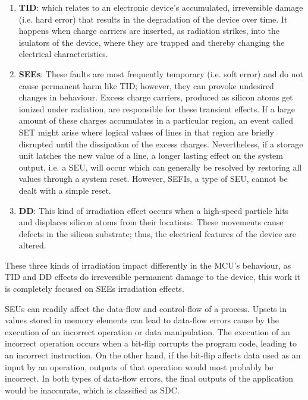 \documentclass[10pt, a4paper]{report}
\begin{document}
\begin{enumerate}
    \item \textbf{\acrfull{TID}}: which relates to an electronic device's
        accumulated, irreversible damage (i.e. hard error) that results in the
        degradation of the device over time. It happens when charge carriers
        are inserted, as radiation strikes, into the isulators of the device,
        where they are trapped and thereby changing the electrical 
        characteristics.
    \item \textbf{\acrfull{SEEs}}: These faults are most frequently temporary
        (i.e. soft error) and do not cause permanent harm like \acrshort{TID};
        however, they can provoke undesired changes in behaviour. Excess charge
        carriers, produced as silicon atoms get ionized under radiation, are
        responsible for these transient effects. If a large amount of these
        charges accumulates in a particular region, an event called 
        \acrfull{SET} might arise where logical values of lines in that region
        are briefly disrupted until the dissipation of the excess charges.
        Nevertheless, if a storage unit latches the new value of a line, a
        longer lasting effect on the system output, i.e. a \acrfull{SEU}, will
        occur which can generally be resolved by restoring all values through a
        system reset. However, \acrfull{SEFIs}, a type of \acrshort{SEU}, cannot
        be dealt with a simple reset.
    \item \textbf{\acrfull{DD}}: This kind of irradiation effect occurs when a
        high-speed particle hits and displaces silicon atoms from their
        locations. These movements cause defects in the silicon substrate; thus,
        the electrical features of the device are altered.
\end{enumerate}

These three kinds of irradiation impact differently in the \acrshort{MCU}'s
behaviour, as \acrshort{TID} and \acrshort{DD} effects do irreversible permanent 
damage to the device, this work it is completely focused on \acrshort{SEEs} 
irradiation effects.

\acrshort{SEU}s can readily affect the data-flow and control-flow of a
process. Upsets in values stored in memory elements can lead to data-flow errors 
cause by the execution of an incorrect operation or data manipulation. The
execution of an incorrect operation occurs when a bit-flip corrupts the program
code, leading to an incorrect instruction. On the other hand, if the bit-flip
affects data used as an input by an operation, outputs of that operation would
most probably be incorrect. In both types of data-flow errors, the final outputs
of the application would be inaccurate, which is classified as \acrshort{SDC}.
\end{document}
